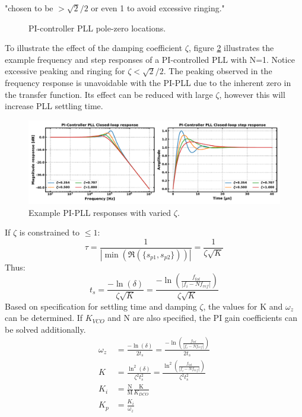 			"chosen to be $>\sqrt{2}/2$ or even 1 to avoid excessive ringing."
			\begin{figure}[htb!]
				\center
				\caption{PI-controller PLL pole-zero locations.}
				\label{fig:pi_pll_pz}
			\end{figure}
			\FloatBarrier
			To illustrate the effect of the damping coefficient $\zeta$, figure \ref{fig:pi_pll_response} illustrates the example frequency and step responses of a PI-controlled PLL with N=1. Notice excessive peaking and ringing for $\zeta<\sqrt{2}/2$. The peaking observed in the frequency response is unavoidable with the PI-PLL due to the inherent zero in the transfer function. Its effect can be reduced with large $\zeta$, however this will increase PLL settling time. 
			\begin{figure}[htb!]
				\center\includegraphics[width=1.0\textwidth, angle=0]{figs/pi_pll_response.pdf}
				\caption{Example PI-PLL responses with varied $\zeta$.}
				\label{fig:pi_pll_response}
			\end{figure}
			\FloatBarrier
			If $\zeta$ is constrained to $\leq 1$:
			\begin{equation}
				\tau = \frac{1}{|\min(\Re(\{s_{p1}, s_{p2}\}))|} = \frac{1}{\zeta\sqrt{K}}
			\end{equation}
			Thus:
			\begin{equation}
				t_s = \frac{-\ln(\delta)}{\zeta\sqrt{K}} = \frac{-\ln\left(\frac{f_{tol}}{|f_i - Nf_{ref}|}\right)}{\zeta\sqrt{K}} 
			\end{equation}
			Based on specification for settling time and damping $\zeta$, the values for K and $\omega_z$ can be determined. If $K_{VCO}$ and $\mathrm{N}$ are also specified, the PI gain coefficients can be solved additionally.
			\begin{align}
				\omega_z &= \frac{-\ln(\delta)}{2t_s} =  \frac{-\ln\left(\frac{f_{tol}}{|f_i - Nf_{ref}|}\right)}{2t_s}\\
				K &= \frac{\ln^2(\delta)}{\zeta^2t_s^2} =  \frac{\ln^2\left(\frac{f_{tol}}{|f_i - Nf_{ref}|}\right)}{\zeta^2t_s^2}\\
				K_i & = \frac{\mathrm{N}}{\mathrm{M}}\frac{\mathrm{K}}{K_{DCO}} \\
				K_p & = \frac{K_i}{\omega_z}
			\end{align}
